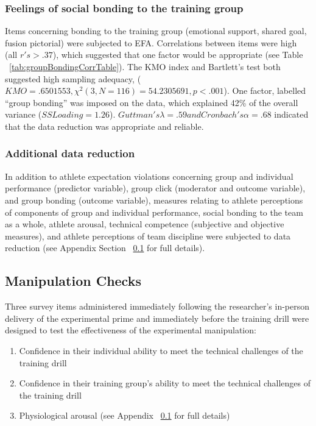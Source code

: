 \subsubsection{Feelings of social bonding to the training group}
Items concerning bonding to the training group (emotional support, shared goal, fusion pictorial) were subjected to EFA.  Correlations between items were high (all $r's > .37$), which suggested that one factor would be appropriate (see Table ~\ref{tab:groupBondingCorrTable}). The KMO index and Bartlett's test both suggested high sampling adequacy, ($KMO =  .6501553, \chi^2(3, N = 116) = 54.2305691, p < .001$).
One factor, labelled ``group bonding'' was imposed on the data, which explained 42\% of the overall variance ($SS Loading = 1.26$). $Guttman's \lambda = .59 and Cronbach's \alpha = .68$ indicated that the data reduction was appropriate and reliable.

\subsubsection{Additional data reduction}
In addition to athlete expectation violations concerning group and individual performance (predictor variable), group click (moderator and outcome variable), and group bonding (outcome variable), measures relating to athlete perceptions of components of group and individual performance, social bonding to the team as a whole, athlete arousal, technical competence (subjective and objective measures), and athlete perceptions of team discipline were subjected to data reduction (see Appendix Section ~\ref{} for full details).


\subsection{Manipulation Checks}
Three survey items administered immediately following the researcher's in-person delivery of the experimental prime and immediately before the training drill were designed to test the effectiveness of the experimental manipulation:

\begin{enumerate}
  \item Confidence in their individual ability to meet the technical challenges of the training drill
  \item Confidence in their training group's ability to meet the technical challenges of the training drill
  \item Physiological arousal (see Appendix ~\ref{} for full details)
\end{enumerate}

